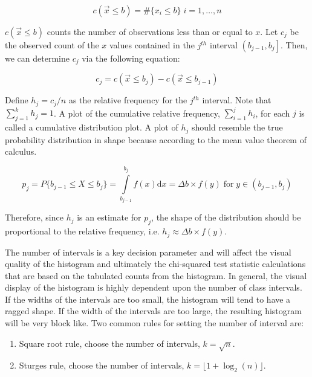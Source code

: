 \documentclass[
]{book}
\theoremstyle{definition}
\theoremstyle{definition}
\theoremstyle{definition}
\theoremstyle{definition}
\theoremstyle{remark}
\begin{document}
\begin{equation}
c(\vec{x}\leq b) = \#\lbrace x_i \leq b \rbrace \; i=1,\ldots,n
\label{eq:cumSum}
\end{equation}

\(c(\vec{x}\leq b)\) counts the number of observations less than or equal
to \(x\). Let \(c_{j}\) be the observed count of the \(x\) values contained in
the \(j^{th}\) interval \(\left(b_{j-1}, b_{j} \right]\). Then, we can
determine \(c_{j}\) via the following equation:

\begin{equation}
c_{j} = c(\vec{x}\leq b_{j}) - c(\vec{x}\leq b_{j-1})
\label{eq:csubj}
\end{equation}

Define \(h_j = c_j/n\) as the relative frequency for the \(j^{th}\)
interval. Note that \(\sum\nolimits_{j=1}^{k} h_{j} = 1\). A plot of the
cumulative relative frequency, \(\sum\nolimits_{i=1}^{j} h_{i}\), for each
\(j\) is called a cumulative distribution plot. A plot of \(h_j\) should
resemble the true probability distribution in shape because according to
the mean value theorem of calculus.

\[p_j = P\{b_{j-1} \leq X \leq b_{j}\} = \int\limits_{b_{j-1}}^{b_{j}} f(x) \mathrm{d}x = \Delta b \times f(y) \; \text{for} \; y \in \left(b_{j-1}, b_{j} \right)\]

Therefore, since \(h_j\) is an estimate for \(p_j\), the shape of the
distribution should be proportional to the relative frequency, i.e.
\(h_j \approx \Delta b \times f(y)\).

The number of intervals is a key decision parameter and will affect the
visual quality of the histogram and ultimately the chi-squared test
statistic calculations that are based on the tabulated counts from the
histogram. In general, the visual display of the histogram is highly
dependent upon the number of class intervals. If the widths of the
intervals are too small, the histogram will tend to have a ragged shape.
If the width of the intervals are too large, the resulting histogram
will be very block like. Two common rules for setting the number of
interval are:

\begin{enumerate}
\def\labelenumi{\arabic{enumi}.}
\item
  Square root rule, choose the number of intervals, \(k = \sqrt{n}\).
\item
  Sturges rule, choose the number of intervals,
  \(k = \lfloor 1 + \log_{2}(n) \rfloor\).
\end{enumerate}
\end{document}
